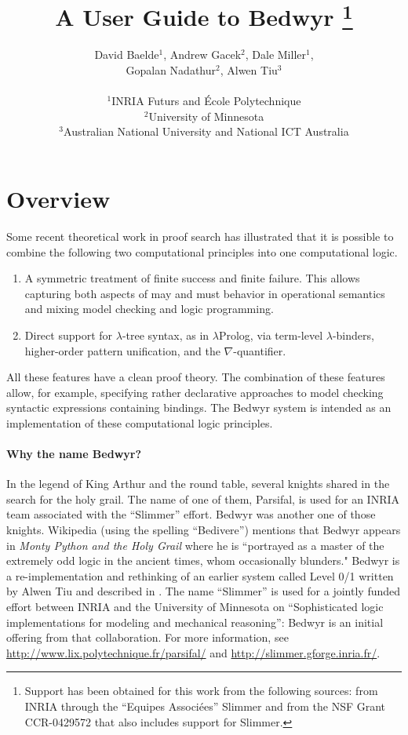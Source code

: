 \documentclass{article}
\title{{\Huge A User Guide to Bedwyr}
   \thanks{Support has been obtained for this work from the following
           sources: from INRIA through the ``Equipes Associ{\'e}es''
           Slimmer and from the NSF Grant CCR-0429572 that also
           includes support for Slimmer.}
}
\author{David Baelde$^1$, Andrew Gacek$^2$, Dale Miller$^1$, \\
        Gopalan Nadathur$^2$, Alwen Tiu$^3$  \\ \\
$^1$INRIA Futurs and \'Ecole Polytechnique\\
$^2$University of Minnesota\\
$^3$Australian National University and National ICT Australia
}
\begin{document}
\maketitle

\section{Overview}

Some recent theoretical work in proof search has illustrated that it
is possible to combine the following two computational principles into
one computational logic.
\begin{enumerate}
\item A symmetric treatment of finite success and finite failure.
  This allows capturing both aspects of may and must behavior in
  operational semantics and mixing model checking and logic programming.

\item Direct support for $\lambda$-tree syntax, as in $\lambda$Prolog,
       via term-level $\lambda$-binders, higher-order pattern
       unification, and the $\nabla$-quantifier.
\end{enumerate}
All these features have a clean proof theory.  The combination of
these features allow, for example, specifying rather declarative
approaches to model checking syntactic expressions containing
bindings.  The Bedwyr system is intended as an implementation of these
computational logic principles.


\paragraph{Why the name Bedwyr?}
In the legend of King Arthur and the round table, several knights
shared in the search for the holy grail.  The name of one of them,
Parsifal, is used for an INRIA team associated with the ``Slimmer''
effort.  Bedwyr was another one of those knights.  Wikipedia (using
the spelling ``Bedivere'') mentions that Bedwyr appears in {\em Monty
Python and the Holy Grail} where he is ``portrayed as a master of the
extremely odd logic in the ancient times, whom occasionally blunders."
Bedwyr is a re-implementation and rethinking of an earlier system
called Level 0/1 written by Alwen Tiu and described in
\cite{tiu05eshol}. The name ``Slimmer'' is used for a jointly funded
effort between INRIA and the University of Minnesota on
``Sophisticated logic implementations for modeling and mechanical
reasoning'': Bedwyr is an initial offering from
that collaboration.
For more information, see
\url{http://www.lix.polytechnique.fr/parsifal/} and
\url{http://slimmer.gforge.inria.fr/}.
\end{document}
